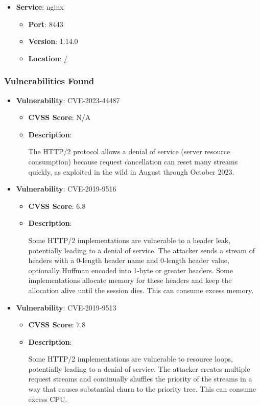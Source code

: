 \documentclass{article}
\begin{document}
\begin{itemize}
        \item \textbf{Service}: nginx
        \begin{itemize}
            \item \textbf{Port}: 8443
            \item \textbf{Version}:  1.14.0 
            \item \textbf{Location}: \href{ / }{ / }
        \end{itemize}
    
\end{itemize}


\subsubsection*{Vulnerabilities Found}

\begin{itemize}
    
        \item \textbf{Vulnerability}: CVE-2023-44487
        \begin{itemize}
            \item \textbf{CVSS Score}:  N/A 
            \item \textbf{Description}:
            \parbox[t]{0.9\linewidth}{
                \ttfamily The HTTP/2 protocol allows a denial of service (server resource consumption) because request cancellation can reset many streams quickly, as exploited in the wild in August through October 2023.
            }
        \end{itemize}
    
        \item \textbf{Vulnerability}: CVE-2019-9516
        \begin{itemize}
            \item \textbf{CVSS Score}:  6.8 
            \item \textbf{Description}:
            \parbox[t]{0.9\linewidth}{
                \ttfamily Some HTTP/2 implementations are vulnerable to a header leak, potentially leading to a denial of service. The attacker sends a stream of headers with a 0-length header name and 0-length header value, optionally Huffman encoded into 1-byte or greater headers. Some implementations allocate memory for these headers and keep the allocation alive until the session dies. This can consume excess memory.
            }
        \end{itemize}
    
        \item \textbf{Vulnerability}: CVE-2019-9513
        \begin{itemize}
            \item \textbf{CVSS Score}:  7.8 
            \item \textbf{Description}:
            \parbox[t]{0.9\linewidth}{
                \ttfamily Some HTTP/2 implementations are vulnerable to resource loops, potentially leading to a denial of service. The attacker creates multiple request streams and continually shuffles the priority of the streams in a way that causes substantial churn to the priority tree. This can consume excess CPU.
            }
        \end{itemize}
    

\end{itemize}
\end{document}
